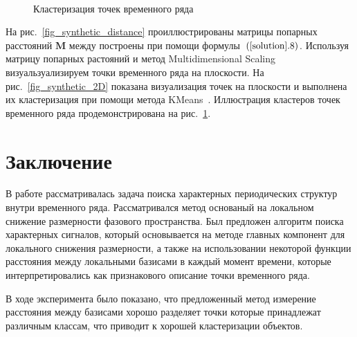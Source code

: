\documentclass[12pt, twoside]{article}
\begin{document}
\begin{figure}[h!t]\center
{}
\\
\caption{Кластеризация точек временного ряда}
\label{fig_synthetic_claster}
\end{figure}

На рис.~\ref{fig_synthetic_distance} проиллюстрированы матрицы попарных расстояний $\textbf{M}$ между построены при помощи формулы~$(\ref{solution}.8)$. Используя матрицу попарных растояний и метод Multidimensional Scaling~\cite{Borg2005} визуальзуализируем точки временного ряда на плоскости. На рис.~\ref{fig_synthetic_2D} показана визуализация точек на плоскости и выполнена их кластеризация при помощи метода KMeans~\cite{Kanungo2000}. Иллюстрация кластеров точек временного ряда продемонстрирована на рис.~\ref{fig_synthetic_claster}.



\section{Заключение}
В работе рассматривалась задача поиска характерных периодических структур внутри временного ряда. Рассматривался метод основаный на локальном снижение размерности фазового пространства. Был предложен алгоритм поиска характерных сигналов, который основывается на методе главных компонент для локального снижения размерности, а также на использовании некоторой функции расстояния между локальными базисами в каждый момент времени, которые интерпретировались как признакового описание точки временного ряда.

В ходе эксперимента было показано, что предложенный метод измерение расстояния между базисами хорошо разделяет точки которые принадлежат различным классам, что приводит к хорошей кластеризации объектов.
\end{document}
